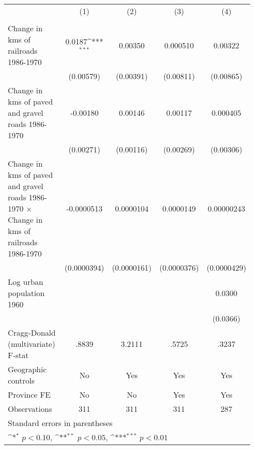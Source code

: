 {
\def\sym#1{\ifmmode^{#1}\else\(^{#1}\)\fi}
\begin{tabular}{l*{4}{c}}
\hline\hline
                &\multicolumn{1}{c}{(1)}&\multicolumn{1}{c}{(2)}&\multicolumn{1}{c}{(3)}&\multicolumn{1}{c}{(4)}\\
                &\multicolumn{1}{c}{}&\multicolumn{1}{c}{}&\multicolumn{1}{c}{}&\multicolumn{1}{c}{}\\
\hline
Change in kms of railroads 1986-1970&   0.0187\sym{***}&  0.00350         & 0.000510         &  0.00322         \\
                &(0.00579)         &(0.00391)         &(0.00811)         &(0.00865)         \\
[1em]
Change in kms of paved and gravel roads 1986-1970& -0.00180         &  0.00146         &  0.00117         & 0.000405         \\
                &(0.00271)         &(0.00116)         &(0.00269)         &(0.00306)         \\
[1em]
Change in kms of paved and gravel roads 1986-1970 $\times$ Change in kms of railroads 1986-1970&-0.0000513         &0.0000104         &0.0000149         &0.00000243         \\
                &(0.0000394)         &(0.0000161)         &(0.0000376)         &(0.0000429)         \\
[1em]
Log urban population 1960&                  &                  &                  &   0.0300         \\
                &                  &                  &                  & (0.0366)         \\
\hline
Cragg-Donald (multivariate) F-stat&    .8839         &   3.2111         &    .5725         &    .3237         \\
Geographic controls&       No         &      Yes         &      Yes         &      Yes         \\
Province FE     &       No         &       No         &      Yes         &      Yes         \\
Observations    &      311         &      311         &      311         &      287         \\
\hline\hline
\multicolumn{5}{l}{\footnotesize Standard errors in parentheses}\\
\multicolumn{5}{l}{\footnotesize \sym{*} \(p<0.10\), \sym{**} \(p<0.05\), \sym{***} \(p<0.01\)}\\
\end{tabular}
}
